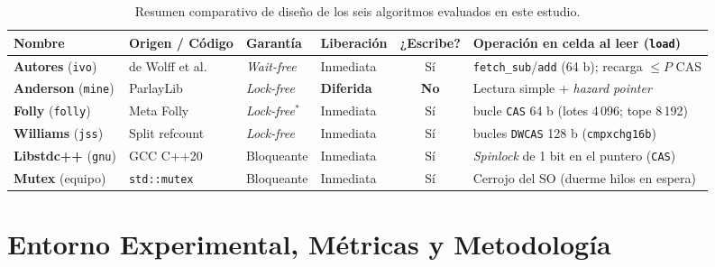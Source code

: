 \documentclass[11pt,a4paper]{article}
\begin{document}
\begin{table}[H]
\centering
\caption{Resumen comparativo de diseño de los seis algoritmos evaluados en este estudio.}
\label{tab:algoritmos}
\footnotesize
\setlength{\tabcolsep}{4pt}
\begin{tabularx}{\linewidth}{@{}l >{\raggedright\arraybackslash}p{2.7cm} l l c >{\raggedright\arraybackslash}X@{}}
\toprule
\textbf{Nombre} & \textbf{Origen / Código} & \textbf{Garantía} & \textbf{Liberación} & \textbf{¿Escribe?} & \textbf{Operación en celda al leer (\texttt{load})} \\
\midrule
\textbf{Autores} (\texttt{ivo}) & de Wolff et al.~\cite{dewolff2024waitfree,dewolff2024repo} & \emph{Wait-free} & Inmediata & Sí & 1 \texttt{fetch\_sub}/\texttt{add} (64 b); recarga $\le P$ CAS \\
\textbf{Anderson} (\texttt{mine}) & ParlayLib~\cite{anderson2021cdrc,anderson2023cppcon} & \emph{Lock-free} & \textbf{Diferida} & \textbf{No} & Lectura simple + \emph{hazard pointer}~\cite{michael2004hazard} \\
\textbf{Folly} (\texttt{folly}) & Meta Folly~\cite{folly2024} & \emph{Lock-free}$^*$ & Inmediata & Sí & 1 bucle \texttt{CAS} 64 b (lotes 4\,096; tope 8\,192) \\
\textbf{Williams} (\texttt{jss}) & Split refcount~\cite{williams2012concurrency} & \emph{Lock-free} & Inmediata & Sí & 2 bucles \texttt{DWCAS} 128 b (\texttt{cmpxchg16b}) \\
\textbf{Libstdc++} (\texttt{gnu}) & GCC C++20~\cite{sutter2014atomic} & Bloqueante & Inmediata & Sí & \emph{Spinlock} de 1 bit en el puntero (\texttt{CAS}) \\
\textbf{Mutex} (equipo) & \texttt{std::mutex} & Bloqueante & Inmediata & Sí & Cerrojo del SO (duerme hilos en espera) \\
\bottomrule
\end{tabularx}
\par\vspace{2pt}{\footnotesize $^*$Folly cede el turno de forma bloqueante si coinciden más de 8\,192 lectores en la misma celda. En Anderson la liberación diferida afecta solo al bloque de control, no al objeto de datos.}
\end{table}

\section{Entorno Experimental, Métricas y Metodología}
\end{document}
